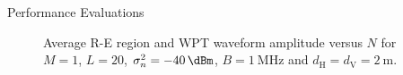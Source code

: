 \documentclass[journal]{IEEEtran}
\begin{document}
\begin{section}{Performance Evaluations}
		\begin{figure}[!t]
			\centering
			\caption{Average R-E region and WPT waveform amplitude versus $N$ for $M=1$, $L=20$, $\sigma_n^2=\SI{-40}{\dBm}$, $B=\SI{1}{\MHz}$ and $d_{\mathrm{H}}=d_{\mathrm{V}}=\SI{2}{\meter}$.}
		\end{figure}


\end{section}
\end{document}
